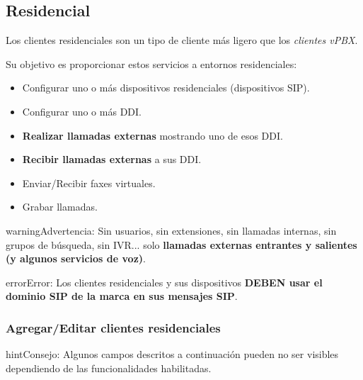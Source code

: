 \documentclass[letterpaper,10pt,spanish]{sphinxmanual}
\begin{document}
\subsection{Residencial}
\label{administration_portal/brand/clients/residential:residential}\label{administration_portal/brand/clients/residential::doc}
Los clientes residenciales son un tipo de cliente más ligero que los \emph{clientes vPBX}.

Su objetivo es proporcionar estos servicios a entornos residenciales:
\begin{itemize}
\item {} 
Configurar uno o más dispositivos residenciales (dispositivos SIP).

\item {} 
Configurar uno o más DDI.

\item {} 
\textbf{Realizar llamadas externas} mostrando uno de esos DDI.

\item {} 
\textbf{Recibir llamadas externas} a sus DDI.

\item {} 
Enviar/Recibir faxes virtuales.

\item {} 
Grabar llamadas.

\end{itemize}

\begin{notice}{warning}{Advertencia:}
Sin usuarios, sin extensiones, sin llamadas internas, sin grupos de búsqueda, sin IVR... solo \textbf{llamadas externas entrantes y salientes (y algunos servicios de voz)}.
\end{notice}

\begin{notice}{error}{Error:}
Los clientes residenciales y sus dispositivos \textbf{DEBEN usar el dominio SIP de la marca en sus mensajes SIP}.
\end{notice}


\subsubsection{Agregar/Editar clientes residenciales}
\label{administration_portal/brand/clients/residential:adding-editing-residential-clients}
\begin{notice}{hint}{Consejo:}
Algunos campos descritos a continuación pueden no ser visibles dependiendo de las funcionalidades habilitadas.
\end{notice}
\end{document}
